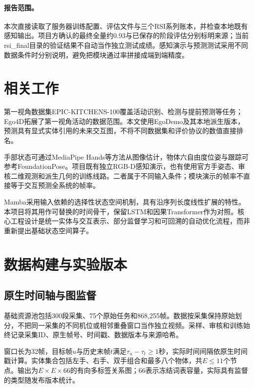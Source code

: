 \paragraph{报告范围。}
本次直接读取了服务器训练配置、评估文件与三个RSI系列账本，并检查本地既有感知输出。项目方确认的最终全量约0.93与已保存的阶段评估分别标明来源；当前rsi\_final目录的验证结果不自动当作独立测试成绩。感知演示与预测测试采用不同数据条件时分别说明，避免把模块通过率拼接成端到端精度。

\section{相关工作}
第一视角数据集EPIC-KITCHENS-100覆盖活动识别、检测与提前预测等任务\cite{damen2022rescaling}；Ego4D拓展了第一视角活动的数据范围\cite{grauman2022ego4d}。本文使用EgoDemo及其本地派生版本\cite{egodemo}，预测具有显式实体引用的未来交互图，不将不同数据集和评价协议的数值直接排名。

手部状态可通过MediaPipe Hands等方法从图像估计\cite{zhang2020mediapipe}，物体六自由度位姿与跟踪可参考FoundationPose\cite{wen2024foundationpose}。项目既有独立RGB-D感知演示，也有使用官方手姿态、审核二维观测和派生几何的训练线路。二者属于不同输入条件；模块演示的帧率不直接等于交互预测全系统的帧率。

Mamba采用输入依赖的选择性状态空间机制，具有沿序列长度线性扩展的特性\cite{gu2023mamba}。本项目将其用作可替换的时间骨干，保留LSTM和因果Transformer作为对照。核心工程设计是统一实体与交互表示、部分监督学习和可回溯的自动优化流程，而非重新提出基础状态空间算子。



\section{数据构建与实验版本}
\subsection{原生时间轴与图监督}
基础资源池包括300段采集、75个原始任务和868,255帧。数据按采集保持原始划分，不把同一采集的不同机位或相邻重叠窗口当作独立视频。采样、审核和训练始终记录采集ID、原生帧号、时间戳、数据版本与来源哈希。

窗口长为32帧，目标帧$u$与历史末帧$t$满足$\tau_u-\tau_t\geq1$秒，实际时间间隔依原生时间戳计算。实体集合包括左手、右手、双手组合和最多八个物体，共$E\leq11$个节点。输出为$E\times E\times66$的有向多标签关系图；66表示冻结词表容量，实际具有监督的类型随发布版本统计。

